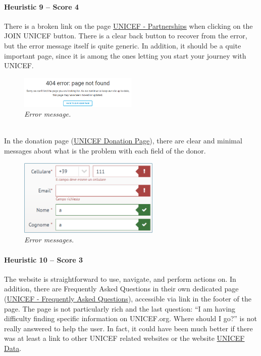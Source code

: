 \paragraph*{Heuristic 9 – Score 4}
There is a broken link on the page \href{https://www.unicef.org/partnerships}{UNICEF - Partnerships} when clicking on the JOIN UNICEF button. There is a clear back button to recover from the error, but the error message itself is quite generic. In addition, it should be a quite important page, since it is among the ones letting you start your journey with UNICEF.
\begin{figure}[h]
	\centering
	\begin{center}
		\includegraphics[width=0.5\textwidth]{Picture13.png}
	\end{center}
	\captionsetup{font=small}
	\caption{\textit{Error message.}}
	\label{fig:label13}
\end{figure}
\\
In the donation page (\href{https://donazioni.unicef.it/}{UNICEF Donation Page}), there are clear and minimal messages about what is the problem with each field of the donor.
\begin{figure}[h]
	\centering
	\begin{center}
		\includegraphics[width=0.6\textwidth]{Picture14.png}
	\end{center}
	\captionsetup{font=small}
	\caption{\textit{Error messages.}}
	\label{fig:label14}
\end{figure}

\newpage

\paragraph*{Heuristic 10 – Score 3}
The website is straightforward to use, navigate, and perform actions on. In addition, there are Frequently Asked Questions in their own dedicated page (\href{https://www.unicef.org/about-unicef/frequently-asked-questions}{UNICEF - Frequently Asked Questions}), accessible via link in the footer of the page. The page is not particularly rich and the last question: “I am having difficulty finding specific information on UNICEF.org. Where should I go?” is not really answered to help the user. In fact, it could have been much better if there was at least a link to other UNICEF related websites or the website \href{https://data.unicef.org/}{UNICEF Data}.


